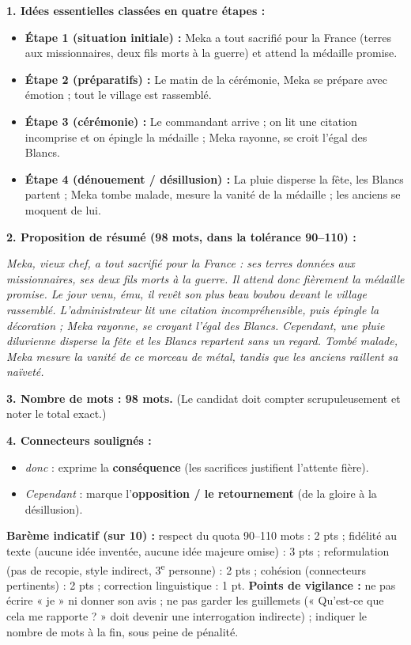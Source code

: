\documentclass[11pt]{article}
\begin{document}
\begin{corrige}
\textbf{1. Idées essentielles classées en quatre étapes :}
\begin{itemize}
\item \textbf{Étape 1 (situation initiale) :} Meka a tout sacrifié pour la France (terres aux missionnaires, deux fils morts à la guerre) et attend la médaille promise.
\item \textbf{Étape 2 (préparatifs) :} Le matin de la cérémonie, Meka se prépare avec émotion ; tout le village est rassemblé.
\item \textbf{Étape 3 (cérémonie) :} Le commandant arrive ; on lit une citation incomprise et on épingle la médaille ; Meka rayonne, se croit l'égal des Blancs.
\item \textbf{Étape 4 (dénouement / désillusion) :} La pluie disperse la fête, les Blancs partent ; Meka tombe malade, mesure la vanité de la médaille ; les anciens se moquent de lui.
\end{itemize}
\textbf{2. Proposition de résumé (98 mots, dans la tolérance 90--110) :}

\emph{Meka, vieux chef, a tout sacrifié pour la France : ses terres données aux missionnaires, ses deux fils morts à la guerre. Il attend donc fièrement la médaille promise. Le jour venu, ému, il revêt son plus beau boubou devant le village rassemblé. L'administrateur lit une citation incompréhensible, puis épingle la décoration ; Meka rayonne, se croyant l'égal des Blancs. Cependant, une pluie diluvienne disperse la fête et les Blancs repartent sans un regard. Tombé malade, Meka mesure la vanité de ce morceau de métal, tandis que les anciens raillent sa naïveté.}

\textbf{3. Nombre de mots : 98 mots.} (Le candidat doit compter scrupuleusement et noter le total exact.)

\textbf{4. Connecteurs soulignés :}
\begin{itemize}
\item \emph{donc} : exprime la \textbf{conséquence} (les sacrifices justifient l'attente fière).
\item \emph{Cependant} : marque l'\textbf{opposition / le retournement} (de la gloire à la désillusion).
\end{itemize}
\textbf{Barème indicatif (sur 10) :} respect du quota 90--110 mots : 2 pts ; fidélité au texte (aucune idée inventée, aucune idée majeure omise) : 3 pts ; reformulation (pas de recopie, style indirect, 3\textsuperscript{e} personne) : 2 pts ; cohésion (connecteurs pertinents) : 2 pts ; correction linguistique : 1 pt.
\textbf{Points de vigilance :} ne pas écrire « je » ni donner son avis ; ne pas garder les guillemets (« Qu'est-ce que cela me rapporte ? » doit devenir une interrogation indirecte) ; indiquer le nombre de mots à la fin, sous peine de pénalité.
\end{corrige}
\end{document}
